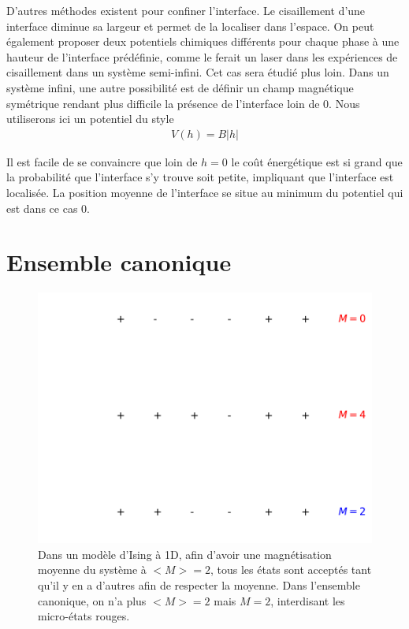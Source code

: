D'autres méthodes existent pour confiner l'interface. Le cisaillement d'une interface diminue sa largeur et permet de la localiser dans l'espace. On peut également proposer deux potentiels chimiques différents pour chaque phase à une hauteur de l'interface prédéfinie, comme le ferait un laser dans les expériences de cisaillement\cite{delville} dans un système semi-infini. Cet cas sera étudié plus loin. Dans un système infini, une autre possibilité est de définir un champ magnétique symétrique rendant plus difficile la présence de l'interface loin de $0$. Nous utiliserons ici un potentiel du style
\begin{align}
		  V(h) = B |h|
\end{align}

Il est facile de se convaincre que loin de $h=0$ le coût énergétique est si grand que la probabilité que l'interface s'y trouve soit petite, impliquant que l'interface est localisée. La position moyenne de l'interface se situe au minimum du potentiel qui est dans ce cas $0$. 

	\section{Ensemble canonique}

\begin{figure}[h]
	\centering
	\includegraphics[scale=1]{isingtosos/figure-canonique.pdf}
	\caption{Dans un modèle d'Ising à 1D, afin d'avoir une magnétisation moyenne du système à $<M>=2$, tous les états sont acceptés tant qu'il y en a d'autres afin de respecter la moyenne. Dans l'ensemble canonique, on n'a plus $<M>=2$ mais $M=2$, interdisant les micro-états rouges.}
\end{figure}

